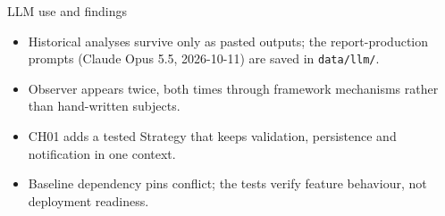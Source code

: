 \documentclass[aspectratio=169,10pt]{beamer}
\newcommand{\code}[1]{\texttt{#1}}
\begin{document}
\begin{frame}{LLM use and findings}
\small
\begin{itemize}
\item Historical analyses survive only as pasted outputs; the report-production prompts (Claude Opus 5.5, 2026-10-11) are saved in \code{data/llm/}.
\item Observer appears twice, both times through framework mechanisms rather than hand-written subjects.
\item CH01 adds a tested Strategy that keeps validation, persistence and notification in one context.
\item Baseline dependency pins conflict; the tests verify feature behaviour, not deployment readiness.
\end{itemize}
\end{frame}
\end{document}
